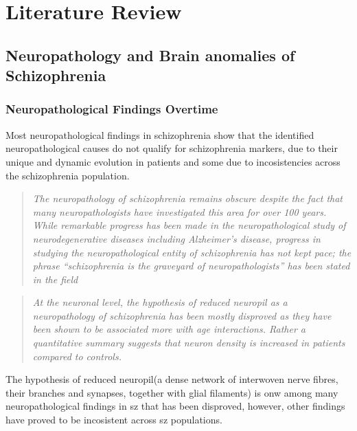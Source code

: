 
\chapter{Literature Review}\label{Ch:2}
\vspace{30pt}


\section{Neuropathology and Brain anomalies of Schizophrenia}\label{sec:Neuropathology_Brain_Anomalies}
\subsection{Neuropathological Findings Overtime}\label{Neuropathology}
Most neuropathological findings in schizophrenia show that the identified neuropathological causes do not qualify for schizophrenia markers, due to their unique and dynamic evolution in patients and some due to incosistencies across the schizophrenia population.
\begin{quotation}
	\textit{The neuropathology of schizophrenia remains obscure despite the fact that many neuropathologists have investigated this area for over 100 years. While remarkable progress has been made in the neuropathological study of neurodegenerative diseases including Alzheimer's disease, progress in studying the neuropathological entity of schizophrenia has not kept pace; the phrase “schizophrenia is the graveyard of neuropathologists” has been stated in the field}
	\begin{flushright}
		\cite{iritani2007neuropathology}
	\end{flushright}
\end{quotation}
\begin{quotation}
	\textit{At the neuronal level, the hypothesis of reduced neuropil as a neuropathology of schizophrenia has been mostly disproved as they have been shown to be associated more with age interactions. Rather a quantitative summary suggests that neuron density is increased in patients compared to controls.}
	\begin{flushright}
		\cite{bakhshi2015neuropathology}
	\end{flushright}
\end{quotation}
The hypothesis of reduced neuropil(a dense network of interwoven nerve fibres, their branches and synapses, together with glial filaments) is onw among many neuropathological findings in \ac{sz} that has been disproved, however, other findings have proved to be incosistent across \ac{sz} populations.
